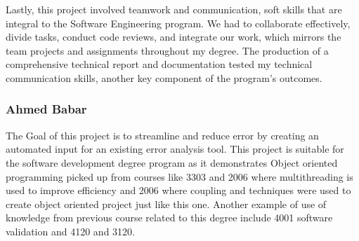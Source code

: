 Lastly, this project involved teamwork and communication, soft skills that are integral to the Software Engineering program. We had to collaborate effectively, divide tasks, conduct code reviews, and integrate our work, which mirrors the team projects and assignments throughout my degree. The production of a comprehensive technical report and documentation tested my technical communication skills, another key component of the program’s outcomes.


\subsubsection{Ahmed Babar}
The Goal of this project is to streamline and reduce error by creating an automated input for an existing error analysis tool. This project is suitable for the software development degree program as it demonstrates Object oriented programming picked up from courses like 3303 and 2006 where multithreading is used to improve efficiency and 2006 where coupling and techniques were used to create object oriented project just like this one. Another example of use of knowledge from previous course related to this degree include 4001 software validation and 4120 and 3120.
